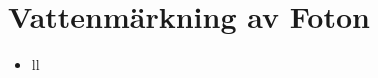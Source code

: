 \documentclass[10pt]{article}
\begin{document}
\chapter{Vattenmärkning av Foton}
    \begin{itemize}
        \item ll
    \end{itemize}
\end{document}
